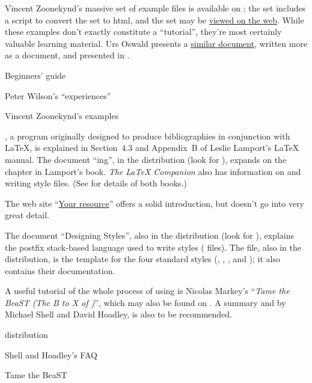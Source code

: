 Vincent Zoonekynd's massive set of example \MP{} files is available on
; the set includes a  script to convert the
set to html, and the set may be %
\href{http://zoonek.free.fr/LaTeX/Metapost/metapost.html}{viewed on the web}.
While these examples don't exactly constitute a ``tutorial'', they're
most certainly valuable learning material.  Urs Oswald presents a
\href{http://www.ursoswald.ch/metapost/tutorial.pdf}{similar document},
written more as a document, and presented in .
\begin{ctanrefs}
\item[\nothtml{\rmfamily}Beginners' guide]
\item[\nothtml{\rmfamily}Peter Wilson's ``experiences'']
\item[\nothtml{\rmfamily}Vincent Zoonekynd's examples]
\end{ctanrefs}


\bibtex{}, a program originally designed to produce bibliographies in
conjunction with \LaTeX{}, is explained in Section~4.3 and Appendix~B
of Leslie Lamport's \LaTeX{} manual.
The document ``\bibtex{}ing'', in the \bibtex{} distribution (look for
),
expands on the chapter in Lamport's book.  \emph{The \LaTeX{} Companion}
also has information on \bibtex{} and writing \bibtex{} style files.
(See  for details of both
books.)

The web site ``\href{http://www.bibtex.org}{Your \bibtex{} resource}''
offers a solid introduction, but doesn't go into very great detail.

The document ``Designing \bibtex{} Styles'', also in the \bibtex{}
distribution (look for
), explains the postfix stack-based language used to
write \bibtex{} styles ( files). The file,
also in the \bibtex{} distribution,
is the template for the four standard styles (,
, , and ); it also
contains their documentation.

A useful tutorial of the whole process of using \bibtex{} is Nicolas
Markey's ``\emph{Tame the BeaST (The B to X of \bibtex{})}'', which
may also be found on .  A summary and  by Michael
Shell and David Hoadley, is also to be recommended.
\begin{ctanrefs}
\item[\nothtml{\rmfamily}\bibtex{} distribution]
\item[\nothtml{\rmfamily}Shell and Hoadley's FAQ]
\item[\nothtml{\rmfamily}Tame the BeaST]
\end{ctanrefs}

